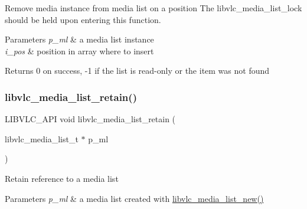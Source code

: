 Remove media instance from media list on a position The libvlc\+\_\+media\+\_\+list\+\_\+lock should be held upon entering this function.


\begin{DoxyParams}{Parameters}
{\em p\+\_\+ml} & a media list instance \\
\hline
{\em i\+\_\+pos} & position in array where to insert \\
\hline
\end{DoxyParams}
\begin{DoxyReturn}{Returns}
0 on success, -\/1 if the list is read-\/only or the item was not found 
\end{DoxyReturn}
\mbox{\label{group__libvlc__media__list_ga2e6c93ff61c6380eb3c07d22ef47da8c}} 
\subsubsection{\texorpdfstring{libvlc\+\_\+media\+\_\+list\+\_\+retain()}{libvlc\_media\_list\_retain()}}
{\footnotesize\ttfamily L\+I\+B\+V\+L\+C\+\_\+\+A\+PI void libvlc\+\_\+media\+\_\+list\+\_\+retain (\begin{DoxyParamCaption}\item[{libvlc\+\_\+media\+\_\+list\+\_\+t $\ast$}]{p\+\_\+ml }\end{DoxyParamCaption})}

Retain reference to a media list


\begin{DoxyParams}{Parameters}
{\em p\+\_\+ml} & a media list created with \hyperlink{group__libvlc__media__list_ga441500e86c4b21cb32afbc96a0733f57}{libvlc\+\_\+media\+\_\+list\+\_\+new()} \\
\hline
\end{DoxyParams}
\mbox{\label{group__libvlc__media__list_ga96a38e5aabb5781c2f1932d332363eef}} 
